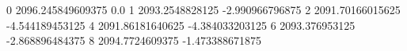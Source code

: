 0 2096.245849609375 0.0
1 2093.2548828125 -2.990966796875
2 2091.70166015625 -4.544189453125
4 2091.86181640625 -4.384033203125
6 2093.376953125 -2.868896484375
8 2094.7724609375 -1.473388671875
